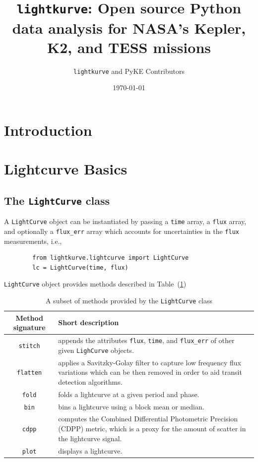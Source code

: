 \documentclass{article}
\title{\texttt{lightkurve}: Open source Python data analysis for NASA's Kepler, K2, and TESS missions}
\author{\texttt{lightkurve} and PyKE Contributors}
\date{\today}
\begin{document}
\maketitle

\begin{abstract}

\end{abstract}

\section{Introduction}

\section{Lightcurve Basics}
    \subsection{The \texttt{LightCurve} class}
        A \texttt{LightCurve} object can be instantiated by passing a \texttt{time}
        array, a \texttt{flux} array, and optionally a \texttt{flux\_err} array which
        accounts for uncertainties in the \texttt{flux} measurements, i.e.,
        \begin{verbatim}
        from lightkurve.lightcurve import LightCurve
        lc = LightCurve(time, flux)
        \end{verbatim}

        \texttt{LightCurve} object provides methods described in
        Table~(\ref{tab:methods})

        \begin{table}[!htb]
            \centering
            \caption{A subset of methods provided by the \texttt{LightCurve} class}
            \begin{tabular}{cp{12cm}}
                \hline
                \textbf{Method signature} & \textbf{Short description} \\
                \hline
                \texttt{stitch} & appends the attributes \texttt{flux},
                \texttt{time}, and \texttt{flux\_err} of other given
                \texttt{LighCurve} objects.\\
                \texttt{flatten} & applies a Savitzky-Golay filter to capture
                low frequency flux variations which can be then removed in order
                to aid transit detection algorithms.\\
                \texttt{fold} & folds a lightcurve at a given period and phase.\\
                \texttt{bin} &  bins a lightcurve using a block mean or median.\\
                \texttt{cdpp} &  computes the Combined Differential Photometric
                Precision (CDPP) metric, which is a proxy for the amount of
                scatter in the lightcurve signal. \\
                \texttt{plot} & displays a lightcurve.
            \end{tabular}
            \label{tab:methods}
        \end{table}
\end{document}
